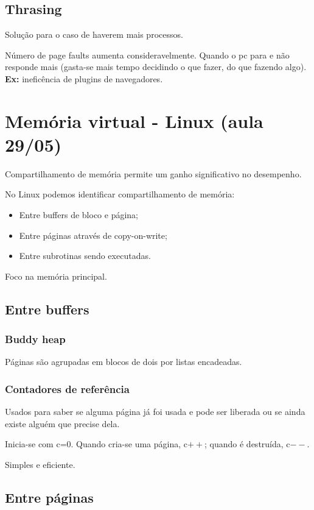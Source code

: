 \documentclass[11pt]{article}
\begin{document}
\subsection{Thrasing}
\label{sec:org6fbeca8}
Solução para o caso de haverem mais processos.

Número de page faults aumenta consideravelmente. Quando o pc para e não responde mais
(gasta-se mais tempo decidindo o que fazer, do que fazendo algo). \textbf{Ex:} ineficência de
plugins de navegadores.
\section{Memória virtual - Linux (aula 29/05)}
\label{sec:orgcb1c4e9}
Compartilhamento de memória permite um ganho significativo no desempenho.

No Linux podemos identificar compartilhamento de memória:
\begin{itemize}
\item Entre buffers de bloco e página;
\item Entre páginas através de copy-on-write;
\item Entre subrotinas sendo executadas.
\end{itemize}
Foco na memória principal.

\subsection{Entre buffers}
\label{sec:org8cf317a}
\subsubsection{Buddy heap}
\label{sec:orga90c78b}
Páginas são agrupadas em blocos de dois por listas encadeadas.
\subsubsection{Contadores de referência}
\label{sec:org2e53853}
Usados para saber se alguma página já foi usada e pode ser liberada ou se ainda existe
alguém que precise dela.

Inicia-se com c=0. Quando cria-se uma página, c\(++\); quando é destruída, c\(--\).

Simples e eficiente.

\subsection{Entre páginas}
\label{sec:orgf06805e}
\end{document}
